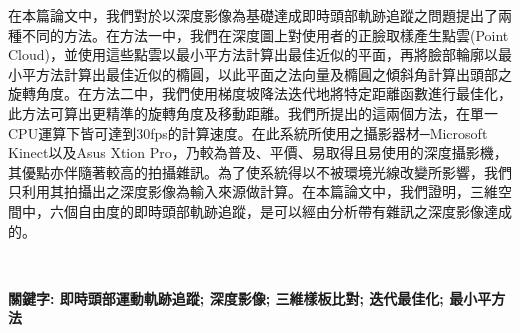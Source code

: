 \begin{abstractCH}

\setlength{\baselineskip}{1.5em}
在本篇論文中，我們對於以深度影像為基礎達成即時頭部軌跡追蹤之問題提出了兩種不同的方法。在方法一中，我們在深度圖上對使用者的正臉取樣產生點雲(Point Cloud)，並使用這些點雲以最小平方法計算出最佳近似的平面，再將臉部輪廓以最小平方法計算出最佳近似的橢圓，以此平面之法向量及橢圓之傾斜角計算出頭部之旋轉角度。在方法二中，我們使用梯度坡降法迭代地將特定距離函數進行最佳化，此方法可算出更精準的旋轉角度及移動距離。我們所提出的這兩個方法，在單一CPU運算下皆可達到30fps的計算速度。在此系統所使用之攝影器材─Microsoft Kinect以及Asus Xtion Pro，乃較為普及、平價、易取得且易使用的深度攝影機，其優點亦伴隨著較高的拍攝雜訊。為了使系統得以不被環境光線改變所影響，我們只利用其拍攝出之深度影像為輸入來源做計算。在本篇論文中，我們證明，三維空間中，六個自由度的即時頭部軌跡追蹤，是可以經由分析帶有雜訊之深度影像達成的。

　

\noindent\bf{關鍵字: 即時頭部運動軌跡追蹤; 深度影像; 三維樣板比對; 迭代最佳化; 最小平方法}
\end{abstractCH}
